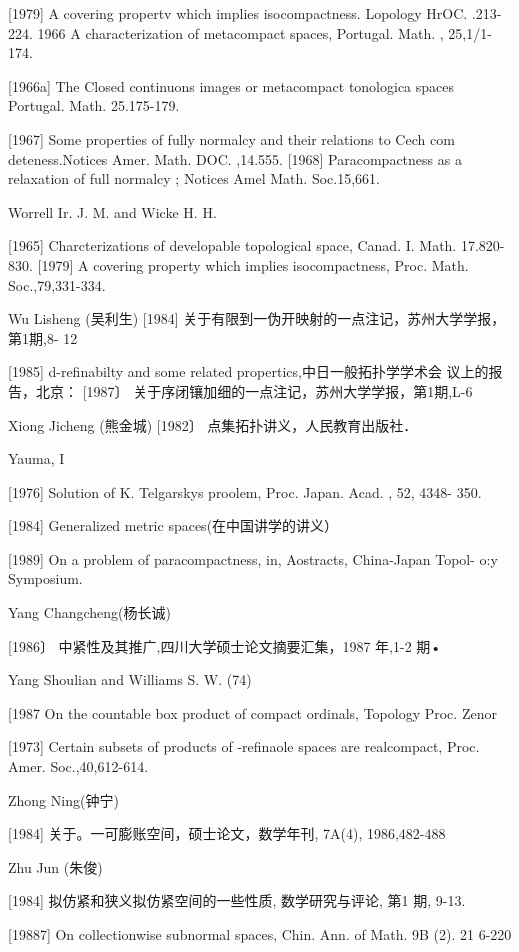 \documentclass[main.tex]{subfiles}
\begin{document}
	[1979]
	A covering propertv which implies isocompactness. Lopology HrOC.
	.213-224.
	1966 A characterization of metacompact spaces, Portugal. Math. , 25,1/1-
	174.

	[1966a]
	The Closed
	continuons images or metacompact
	tonologica spaces
	Portugal.
	Math. 25.175-179.

	[1967]
	Some properties of fully normalcy and their relations to Cech com
	deteness.Notices Amer. Math.
	DOC. ,14.555.
	[1968]
	Paracompactness as a relaxation of full normalcy
	; Notices Amel
	Math. Soc.15,661.

\noindent Worrell Ir. J. M. and Wicke H. H.

	[1965]
	Charcterizations of developable topological space, Canad.
	I. Math.
	17.820-830.
	[1979]
	A covering property which implies isocompactness, Proc.
	Math. Soc.,79,331-334.

\noindent Wu Lisheng (吴利生)
	[1984]
	关于有限到一伪开映射的一点注记，苏州大学学报，第1期,8-
	12
	
[1985] d-refinabilty and some related propertics,中日一般拓扑学学术会
议上的报告，北京：
[1987〕 关于序闭镶加细的一点注记，苏州大学学报，第1期,L-6

\noindent Xiong Jicheng (熊金城)
[1982〕 点集拓扑讲义，人民教育出版社．

\noindent Yauma, I

[1976]
Solution of K. Telgarskys proolem, Proc. Japan. Acad. , 52, 4348-
350.

[1984]
Generalized metric spaces(在中国讲学的讲义）

[1989]
On a problem of paracompactness, in, Aostracts, China-Japan Topol-
o:y Symposium.

\noindent Yang Changcheng(杨长诚)

[1986〕 中紧性及其推广,四川大学硕士论文摘要汇集，1987 年,1-2
期•

\noindent Yang Shoulian and Williams S. W. (74)

[1987 On the countable box product of compact ordinals, Topology Proc.
Zenor

[1973]
Certain subsets of products of -refinaole spaces are realcompact,
Proc. Amer. Soc.,40,612-614.

\noindent Zhong Ning(钟宁)

[1984] 关于。一可膨账空间，硕士论文，数学年刊, 7A(4), 1986,482-488

\noindent Zhu Jun (朱俊)

[1984] 拟仿紧和狭义拟仿紧空间的一些性质, 数学研究与评论, 第1
期, 9-13.

[19887]
On collectionwise subnormal spaces, Chin. Ann. of Math. 9B (2).
21 6-220


	
\end{document}
